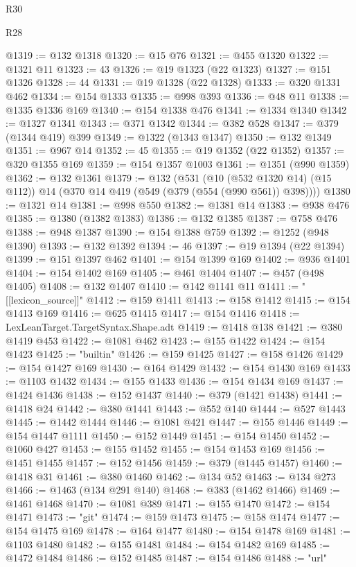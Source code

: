 \begin{lexlean}{R30}
\begin{lexlean}{R28}
\begin{coremodule}
{{{{{{{{{{{{{{{{{{{{{{{{{{{{{{{{{{{{{{{{{{{{{{{{{{{{{{{{{{{{{{{{{{{{{{{{{{{{{{{{{{{{{{{{{{{{{{{{{{{{{{{{{{{{{{{{{{{{{{{{{{{{{{{{{{{{{{{{{{{{{{{@1319 := @132 @1318
@1320 := @15 @76
@1321 := @455 @1320
@1322 := @1321 @11
@1323 := 43
@1326 := @19 @1323 (@22 @1323)
@1327 := @151 @1326
@1328 := 44
@1331 := @19 @1328 (@22 @1328)
@1333 := @320 @1331 @462
@1334 := @154 @1333
@1335 := @998 @393
@1336 := @48 @11
@1338 := @1335 @1336 @169
@1340 := @154 @1338 @476
@1341 := @1334 @1340
@1342 := @1327 @1341
@1343 := @371 @1342
@1344 := @382 @528
@1347 := @379 (@1344 @419) @399
@1349 := @1322 (@1343 @1347)
@1350 := @132 @1349
@1351 := @967 @14
@1352 := 45
@1355 := @19 @1352 (@22 @1352)
@1357 := @320 @1355 @169
@1359 := @154 @1357 @1003
@1361 := @1351 (@990 @1359)
@1362 := @132 @1361
@1379 := @132
    (@531
      (@10 (@532 @1320 @14) (@15 @112))
      @14
      (@370 @14 @419 (@549 (@379 (@554 (@990 @561)) @398))))
@1380 := @1321 @14
@1381 := @998 @550
@1382 := @1381 @14
@1383 := @938 @476
@1385 := @1380 (@1382 @1383)
@1386 := @132 @1385
@1387 := @758 @476
@1388 := @948 @1387
@1390 := @154 @1388 @759
@1392 := @1252 (@948 @1390)
@1393 := @132 @1392
@1394 := 46
@1397 := @19 @1394 (@22 @1394)
@1399 := @151 @1397 @462
@1401 := @154 @1399 @169
@1402 := @936 @1401
@1404 := @154 @1402 @169
@1405 := @461 @1404
@1407 := @457 (@498 @1405)
@1408 := @132 @1407
@1410 := @142 @1141 @11
@1411 := "[[lexicon_source]]"
@1412 := @159 @1411
@1413 := @158 @1412
@1415 := @154 @1413 @169
@1416 := @625 @1415
@1417 := @154 @1416
@1418 := LexLeanTarget.TargetSyntax.Shape.adt
@1419 := @1418 @138
@1421 := @380 @1419 @453
@1422 := @1081 @462
@1423 := @155 @1422
@1424 := @154 @1423
@1425 := "builtin"
@1426 := @159 @1425
@1427 := @158 @1426
@1429 := @154 @1427 @169
@1430 := @164 @1429
@1432 := @154 @1430 @169
@1433 := @1103 @1432
@1434 := @155 @1433
@1436 := @154 @1434 @169
@1437 := @1424 @1436
@1438 := @152 @1437
@1440 := @379 (@1421 @1438)
@1441 := @1418 @24
@1442 := @380 @1441
@1443 := @552 @140
@1444 := @527 @1443
@1445 := @1442 @1444
@1446 := @1081 @421
@1447 := @155 @1446
@1449 := @154 @1447 @1111
@1450 := @152 @1449
@1451 := @154 @1450
@1452 := @1060 @427
@1453 := @155 @1452
@1455 := @154 @1453 @169
@1456 := @1451 @1455
@1457 := @152 @1456
@1459 := @379 (@1445 @1457)
@1460 := @1418 @31
@1461 := @380 @1460
@1462 := @134 @52
@1463 := @134 @273
@1466 := @1463 (@134 @291 @140)
@1468 := @383 (@1462 @1466)
@1469 := @1461 @1468
@1470 := @1081 @389
@1471 := @155 @1470
@1472 := @154 @1471
@1473 := "git"
@1474 := @159 @1473
@1475 := @158 @1474
@1477 := @154 @1475 @169
@1478 := @164 @1477
@1480 := @154 @1478 @169
@1481 := @1103 @1480
@1482 := @155 @1481
@1484 := @154 @1482 @169
@1485 := @1472 @1484
@1486 := @152 @1485
@1487 := @154 @1486
@1488 := "url"
}}}}}}}}}}}}}}}}}}}}}}}}}}}}}}}}}}}}}}}}}}}}}}}}}}}}}}}}}}}}}}}}}}}}}}}}}}}}}}}}}}}}}}}}}}}}}}}}}}}}}}}}}}}}}}}}}}}}}}}}}}}}}}}}}}}}}}}}}}}}}}}
\end{coremodule}
\end{lexlean}
\end{lexlean}

